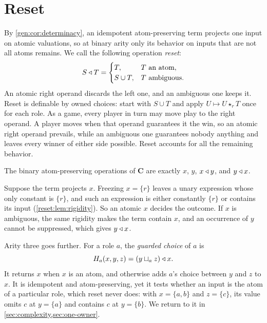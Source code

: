 \section{Reset}\label{sec:reset}

By \cref{gen:cor:determinacy}, an idempotent atom-preserving term projects one input on atomic valuations, so at binary arity only its behavior on inputs that are not all atoms remains. We call the following operation \emph{reset}:
\begin{equation}\label{reset:eq:reset}
 S\mathbin{\triangleleft} T=\begin{cases}T,&T\text{ an atom},\\S\cup T,&T\text{ ambiguous}.\end{cases}
\end{equation}
An atomic right operand discards the left one, and an ambiguous one keeps it. Reset is definable by owned choices: start with $S\cup T$ and apply $U\mapsto U\star_r T$ once for each role. As a game, every player in turn may move play to the right operand. A player moves when that operand guarantees it the win, so an atomic right operand prevails, while an ambiguous one guarantees nobody anything and leaves every winner of either side possible. Reset accounts for all the remaining behavior.

\begin{theorem}\label{reset:thm:binary}
The binary atom-preserving operations of $\mathbf C$ are exactly $x$, $y$, $x\mathbin{\triangleleft} y$, and $y\mathbin{\triangleleft} x$.
\end{theorem}

\begin{idea}
Suppose the term projects $x$. Freezing $x=\{r\}$ leaves a unary expression whose only constant is $\{r\}$, and such an expression is either constantly $\{r\}$ or contains its input (\cref{reset:lem:rigidity}). So an atomic $x$ decides the outcome. If $x$ is ambiguous, the same rigidity makes the term
contain $x$, and an occurrence of $y$ cannot be suppressed, which gives $y\mathbin{\triangleleft} x$.
\end{idea}

Arity three goes further. For a role $a$, the \emph{guarded choice} of $a$ is
\begin{equation}\label{reset:eq:guarded}
 H_a(x,y,z)=(y\sqcup_a z)\mathbin{\triangleleft} x.
\end{equation}
It returns $x$ when $x$ is an atom, and otherwise adds $a$'s choice between $y$ and $z$ to $x$. It is idempotent and atom-preserving, yet it tests whether an input is the atom of a particular role, which reset never does: with $x=\{a,b\}$ and $z=\{c\}$, its value omits $c$ at $y=\{a\}$ and contains $c$ at $y=\{b\}$. We return to it in \cref{sec:complexity,sec:one-owner}.

